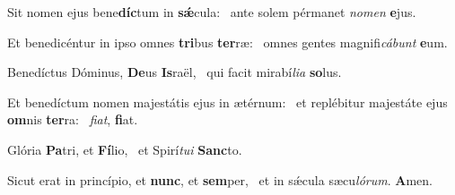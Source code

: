 \item Sit nomen ejus bene\textbf{díc}tum in \textbf{sǽ}cula:~\psstar{} ante solem pérmanet \textit{nomen} \textbf{e}jus.
\item Et benedicéntur in ipso omnes \textbf{tri}bus \textbf{ter}ræ:~\psstar{} omnes gentes magnifi\textit{cábunt} \textbf{e}um.
\item Benedíctus Dóminus, \textbf{De}us \textbf{Is}raël,~\psstar{} qui facit mirabí\textit{lia} \textbf{so}lus.
\item Et benedíctum nomen majestátis ejus in ætérnum:~\pscross{} et replébitur majestáte ejus \textbf{om}nis \textbf{ter}ra:~\psstar{} \textit{fiat}, \textbf{fi}at.
\item Glória \textbf{Pa}tri, et \textbf{Fí}lio,~\psstar{} et Spirí\textit{tui} \textbf{Sanc}to.
\item Sicut erat in princípio, et \textbf{nunc}, et \textbf{sem}per,~\psstar{} et in sǽcula sæcu\textit{lórum}. \textbf{A}men.